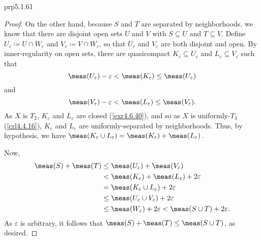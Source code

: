\begin{prp}{}{prp5.1.61}
\begin{proof}
On the other hand, because $S$ and $T$ are separated by neighborhoods, we know that there are disjoint open sets $U$ and $V$ with $S\subseteq U$ and $T\subseteq V$.  Define $U_\varepsilon \coloneqq U\cap W_{\varepsilon}$ and $V_\varepsilon \coloneqq V\cap W_{\varepsilon}$, so that $U_{\varepsilon}$ and $V_{\varepsilon}$ are both disjoint and open.  By inner-regularity on open sets, there are quasicompact $K_{\varepsilon}\subseteq U_{\varepsilon}$ and $L_{\varepsilon}\subseteq V_{\varepsilon}$ such that
\begin{equation}
\meas (U_{\varepsilon})-\varepsilon <\meas (K_{\varepsilon})\leq \meas (U_{\varepsilon})
\end{equation}
and
\begin{equation}
\meas (V_{\varepsilon})-\varepsilon <\meas (L_{\varepsilon})\leq \meas (V_{\varepsilon}).
\end{equation}
As $X$ is $T_2$, $K_{\varepsilon}$ and $L_{\varepsilon}$ are closed (\cref{exr4.6.40}), and so as $X$ is uniformly-$T_3$ (\cref{crl4.4.16}), $K_{\varepsilon}$ and $L_{\varepsilon}$ are uniformly-separated by neighborhoods.   Thus, by hypothesis, we have $\meas (K_{\varepsilon}\cup L_{\varepsilon})=\meas (K_{\varepsilon})+\meas (L_{\varepsilon})$.

Now,
\begin{equation}
\begin{split}
\meas (S)+\meas (T) & \leq \meas (U_{\varepsilon})+\meas (V_{\varepsilon}) \\
& <\meas (K_{\varepsilon})+\meas (L_{\varepsilon})+2\varepsilon \\
& =\meas (K_{\varepsilon}\cup L_{\varepsilon})+2\varepsilon \\
& \leq \meas (U_{\varepsilon}\cup V_{\varepsilon})+2\varepsilon \\
& \leq \meas (W_{\varepsilon})+2\varepsilon <\meas (S\cup T)+2\varepsilon .
\end{split}
\end{equation}
As $\varepsilon$ is arbitrary, it follows that $\meas (S)+\meas (T)\leq \meas (S\cup T)$, as desired.
\end{proof}
\end{prp}
